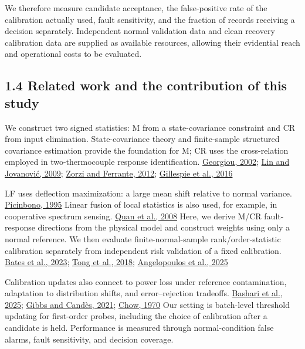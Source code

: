 \documentclass[10pt,a4paper]{article}
\begin{document}
We therefore measure candidate acceptance, the false-positive rate of the calibration actually used, fault sensitivity, and the fraction of records receiving a decision separately. Independent normal validation data and clean recovery calibration data are supplied as available resources, allowing their evidential reach and operational costs to be evaluated.

\subsection{1.4 Related work and the contribution of this study}

We construct two signed statistics: M from a state-covariance constraint and CR from input elimination. State-covariance theory and finite-sample structured covariance estimation provide the foundation for M; CR uses the cross-relation employed in two-thermocouple response identification. \href{https://doi.org/10.1109/TAC.2002.800643}{Georgiou, 2002}; \href{https://doi.org/10.1109/TAC.2009.2017976}{Lin and Jovanović, 2009}; \href{https://doi.org/10.1016/j.automatica.2012.05.057}{Zorzi and Ferrante, 2012}; \href{https://doi.org/10.1016/j.ifacol.2016.07.087}{Gillespie et al., 2016}

LF uses deflection maximization: a large mean shift relative to normal variance. \href{https://doi.org/10.1109/7.395235}{Picinbono, 1995} Linear fusion of local statistics is also used, for example, in cooperative spectrum sensing. \href{https://doi.org/10.1109/JSTSP.2007.914882}{Quan et al., 2008} Here, we derive M/CR fault-response directions from the physical model and construct weights using only a normal reference. We then evaluate finite-normal-sample rank/order-statistic calibration separately from independent risk validation of a fixed calibration. \href{https://doi.org/10.1214/22-AOS2244}{Bates et al., 2023}; \href{https://doi.org/10.1126/sciadv.aao1659}{Tong et al., 2018}; \href{https://doi.org/10.1214/24-AOAS1998}{Angelopoulos et al., 2025}

Calibration updates also connect to power loss under reference contamination, adaptation to distribution shifts, and error–rejection tradeoffs. \href{https://proceedings.mlr.press/v267/bashari25a.html}{Bashari et al., 2025}; \href{https://papers.neurips.cc/paper_files/paper/2021/hash/0d441de75945e5acbc865406fc9a2559-Abstract.html}{Gibbs and Candès, 2021}; \href{https://doi.org/10.1109/TIT.1970.1054406}{Chow, 1970} Our setting is batch-level threshold updating for first-order probes, including the choice of calibration after a candidate is held. Performance is measured through normal-condition false alarms, fault sensitivity, and decision coverage.
\end{document}
